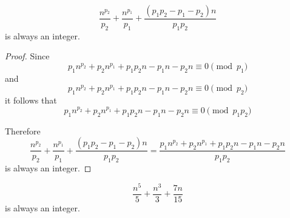 \begin{prop}
    \[ \frac{n^{p_2}}{p_2} + \frac{n^{p_1}}{p_1} + \frac{(p_1 p_2 - p_1 -
    p_2)n}{p_1 p_2} \]
    is always an integer.
\end{prop}
\begin{proof}
    Since
    \[p_1 n^{p_2} + p_2 n^{p_1} + p_1 p_2 n - p_1 n - p_2 n \equiv 0 \pmod{p_1} \]
    and
    \[p_1 n^{p_2} + p_2 n^{p_1} + p_1 p_2 n - p_1 n - p_2 n \equiv 0 \pmod{p_2} \]
    it follows that
    \[p_1 n^{p_2} + p_2 n^{p_1} + p_1 p_2 n - p_1 n - p_2 n \equiv 0 \pmod{p_1 p_2} \]
    
    Therefore 
    \[ 
    \frac{n^{p_2}}{p_2} + \frac{n^{p_1}}{p_1} + \frac{(p_1 p_2 - p_1 -p_2)n}{p_1 p_2} 
    = 
    \frac {p_1 n^{p_2} + p_2 n^{p_1} + p_1 p_2 n - p_1 n - p_2 n}{p_1 p_2}
    \]
    is always an integer.
\end{proof}


\begin{example}
    \[ \frac{n^5}{5} + \frac{n^3}{3} + \frac{7n}{15} \]
    is always an integer.
\end{example}
